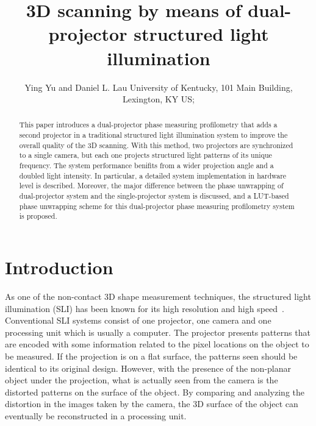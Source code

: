 \documentclass[]{spie}  %
\title{3D scanning by means of dual-projector structured light illumination}
\author{Ying Yu\supit{a} and Daniel L. Lau\supit{a}
\skiplinehalf
\supit{a}University of Kentucky, 101 Main Building, Lexington, KY US; \\
}
\begin{document}
 
  \maketitle 

\begin{abstract}
This paper introduces a dual-projector phase measuring profilometry that adds a second projector in a traditional structured light illumination system to improve the overall quality of the 3D scanning. With this method, two projectors are synchronized to a single camera, but each one projects structured light patterns of its unique frequency. The system performance benifits from a wider projection angle and a doubled light intensity. In particular, a detailed system implementation in hardware level is described. Moreover, the major difference between the phase unwrapping of dual-projector system and the single-projector system is discussed, and a LUT-based phase unwrapping scheme for this dual-projector phase measuring profilometry system is proposed. 
\end{abstract}



\section{Introduction}
\label{sec:intro}  %
As one of the non-contact 3D shape measurement techniques, the structured light illumination (SLI) has been known for its high resolution and high speed~\cite{chen00}. Conventional SLI systems consist of one projector, one camera and one processing unit which is usually a computer. The projector presents patterns that are encoded with some information related to the pixel locations on the object to be measured. If the projection is on a flat surface, the patterns seen should be identical to its original design. However, with the presence of the non-planar object under the projection, what is actually seen from the camera is the distorted patterns on the surface of the object. By comparing and analyzing the distortion in the images taken by the camera, the 3D surface of the object can eventually be reconstructed in a processing unit.
\end{document}
